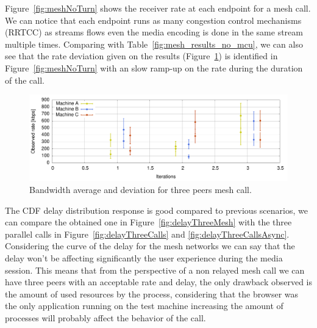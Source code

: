 Figure~\ref{fig:meshNoTurn} shows the receiver rate at each endpoint for a mesh call. We can notice that each endpoint runs as many congestion control mechanisms (RRTCC) as streams flows even the media encoding is done in the same stream multiple times. Comparing with Table~\ref{fig:mesh_results_no_mcu}, we can also see that the rate deviation given on the results (Figure~\ref{fig:bwThreeMesh}) is identified in Figure~\ref{fig:meshNoTurn} with an slow ramp-up on the rate during the duration of the call.

\begin{figure}[h]
  \centering
    \includegraphics[width=1\textwidth]{./figures/mesh_mean_deviation_bw.pdf}
      \caption[Bandwidth average and deviation for three peers mesh call]{Bandwidth average and deviation for three peers mesh call.}
	\label{fig:bwThreeMesh}
\end{figure}

The CDF delay distribution response is good compared to previous scenarios, we can compare the obtained one in Figure~\ref{fig:delayThreeMesh} with the three parallel calls in Figure~\ref{fig:delayThreeCalls} and \ref{fig:delayThreeCallsAsync}. Considering the curve of the delay for the mesh networks we can say that the delay won't be affecting significantly the user experience during the media session. This means that from the perspective of a non relayed mesh call we can have three peers with an acceptable rate and delay, the only drawback observed is the amount of used resources by the process, considering that the browser was the only application running on the test machine increasing the amount of processes will probably affect the behavior of the call.


